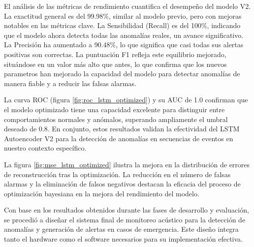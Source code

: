       El análisis de las métricas de rendimiento cuantifica el desempeño del modelo V2. La exactitud general es del 99.98\%, similar al modelo previo, pero con mejoras notables en las métricas clave. La Sensibilidad (Recall) es del 100\%, indicando que el modelo ahora detecta todas las anomalías reales, un avance significativo. La Precisión ha aumentado a 90.48\%, lo que significa que casi todas sus alertas positivas son correctas. La puntuación F1 refleja este equilibrio mejorado, situándose en un valor más alto que antes, lo que confirma que los nuevos parametros han mejorado la capacidad del modelo para detectar anomalías de manera fiable y a reducir las falsas alarmas.

      La curva ROC (figura \ref{fig:roc_lstm_optimized}) y su AUC de 1.0 confirman que el modelo optimizado tiene una capacidad excelente para distinguir entre comportamientos normales y anómalos, superando ampliamente el umbral deseado de 0.8. En conjunto, estos resultados validan la efectividad del LSTM Autoencoder V2 para la detección de anomalías en secuencias de eventos en nuestro contexto específico.

      La figura \ref{fig:mse_lstm_optimized} ilustra la mejora en la distribución de errores de reconstrucción tras la optimización. La reducción en el número de falsas alarmas y la eliminación de falsos negativos destacan la eficacia del proceso de optimización bayesiana en la mejora del rendimiento del modelo.


Con base en los resultados obtenidos durante las fases de desarrollo y evaluación, se procedió a diseñar el sistema final de monitoreo acústico para la detección de anomalías y generación de alertas en casos de emergencia. Este diseño integra tanto el hardware como el software necesarios para su implementación efectiva.

